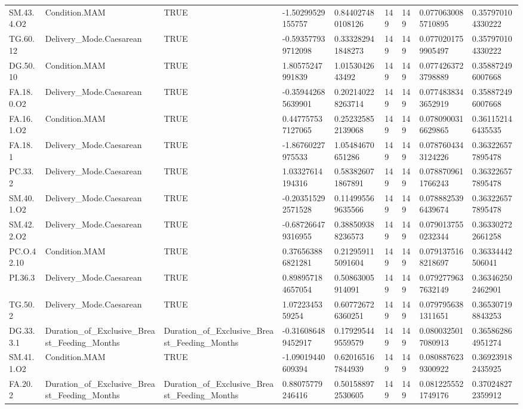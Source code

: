 \begin{longtable}{lllllllll}
SM.43.4.O2 & Condition.MAM & TRUE & -1.50299529155757 & 0.844027480108126 & 149 & 149 & 0.0770630085710895 & 0.357970104330222 \\
TG.60.12 & Delivery\_Mode.Caesarean & TRUE & -0.593577939712098 & 0.333282941848273 & 149 & 149 & 0.0770201759905497 & 0.357970104330222 \\
DG.50.10 & Condition.MAM & TRUE & 1.80575247991839 & 1.0153042643492 & 149 & 149 & 0.0774263723798889 & 0.358872496007668 \\
FA.18.0.O2 & Delivery\_Mode.Caesarean & TRUE & -0.359442685639901 & 0.202140228263714 & 149 & 149 & 0.0774838343652919 & 0.358872496007668 \\
FA.16.1.O2 & Condition.MAM & TRUE & 0.447757537127065 & 0.252325852139068 & 149 & 149 & 0.0780900316629865 & 0.361152146435535 \\
FA.18.1 & Delivery\_Mode.Caesarean & TRUE & -1.86760227975533 & 1.05484670651286 & 149 & 149 & 0.0787604343124226 & 0.363226577895478 \\
PC.33.2 & Delivery\_Mode.Caesarean & TRUE & 1.03327614194316 & 0.583826071867891 & 149 & 149 & 0.0788709611766243 & 0.363226577895478 \\
SM.40.1.O2 & Delivery\_Mode.Caesarean & TRUE & -0.203515292571528 & 0.114995569635566 & 149 & 149 & 0.0788825396439674 & 0.363226577895478 \\
SM.42.2.O2 & Delivery\_Mode.Caesarean & TRUE & -0.687266479316955 & 0.388509388236573 & 149 & 149 & 0.0790137550232344 & 0.363302722661258 \\
PC.O.42.10 & Condition.MAM & TRUE & 0.376563886821281 & 0.212959115091604 & 149 & 149 & 0.0791375168218697 & 0.36334442506041 \\
PI.36.3 & Delivery\_Mode.Caesarean & TRUE & 0.898957184657054 & 0.50863005914091 & 149 & 149 & 0.0792779637632149 & 0.363462502462901 \\
TG.50.2 & Delivery\_Mode.Caesarean & TRUE & 1.0722345359254 & 0.607726726360251 & 149 & 149 & 0.0797956381311651 & 0.365307198843253 \\
DG.33.3.1 & Duration\_of\_Exclusive\_Breast\_Feeding\_Months & Duration\_of\_Exclusive\_Breast\_Feeding\_Months & -0.316086489452917 & 0.179295449559579 & 149 & 149 & 0.0800325017080913 & 0.365862864951274 \\
SM.41.1.O2 & Condition.MAM & TRUE & -1.09019440609394 & 0.620165167844939 & 149 & 149 & 0.0808876239300922 & 0.369239182435925 \\
FA.20.2 & Duration\_of\_Exclusive\_Breast\_Feeding\_Months & Duration\_of\_Exclusive\_Breast\_Feeding\_Months & 0.88075779246416 & 0.501588972530605 & 149 & 149 & 0.0812255521749176 & 0.370248272359912 \\

\end{longtable}
